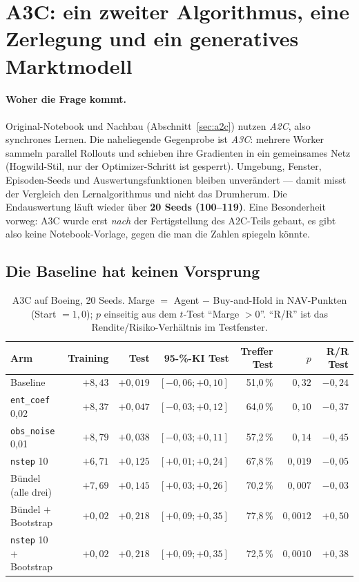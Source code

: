 \section{A3C: ein zweiter Algorithmus, eine Zerlegung und ein generatives Marktmodell}
\label{sec:a3c}

\paragraph{Woher die Frage kommt.} Original-Notebook und Nachbau (Abschnitt~\ref{sec:a2c})
nutzen \emph{A2C}, also synchrones Lernen. Die naheliegende Gegenprobe ist \emph{A3C}:
mehrere Worker sammeln parallel Rollouts und schieben ihre Gradienten in ein gemeinsames
Netz (Hogwild-Stil, nur der Optimizer-Schritt ist gesperrt). Umgebung, Fenster,
Episoden-Seeds und Auswertungsfunktionen bleiben unverändert --- damit misst der Vergleich
den Lernalgorithmus und nicht das Drumherum. Die Endauswertung läuft wieder über
\textbf{20 Seeds (100--119)}. Eine Besonderheit vorweg: A3C wurde erst
\emph{nach} der Fertigstellung des A2C-Teils gebaut, es gibt also keine
Notebook-Vorlage, gegen die man die Zahlen spiegeln könnte.

\subsection{Die Baseline hat keinen Vorsprung}

\begin{table}[H]
  \centering
  \caption{A3C auf Boeing, 20 Seeds. Marge $=$ Agent $-$ Buy-and-Hold in NAV-Punkten
           (Start $=1{,}0$); $p$ einseitig aus dem $t$-Test ``Marge $>0$''.
           ``R/R'' ist das Rendite/Risiko-Verhältnis im Testfenster.}
  \label{tab:a3c-arms}
  \small
  \begin{tabular}{lrrrrrr}
    \toprule
    Arm & Training & Test & 95-\%-KI Test & Treffer Test & $p$ & R/R Test\\
    \midrule
    Baseline                 & $+8{,}43$ & $+0{,}019$ & $[-0{,}06;+0{,}10]$ & 51,0\,\% & $0{,}32$  & $-0{,}24$\\
    \texttt{ent\_coef} 0,02  & $+8{,}37$ & $+0{,}047$ & $[-0{,}03;+0{,}12]$ & 64,0\,\% & $0{,}10$  & $-0{,}37$\\
    \texttt{obs\_noise} 0,01 & $+8{,}79$ & $+0{,}038$ & $[-0{,}03;+0{,}11]$ & 57,2\,\% & $0{,}14$  & $-0{,}45$\\
    \texttt{nstep} 10        & $+6{,}71$ & $+0{,}125$ & $[+0{,}01;+0{,}24]$ & 67,8\,\% & $0{,}019$ & $-0{,}05$\\
    Bündel (alle drei)       & $+7{,}69$ & $+0{,}145$ & $[+0{,}03;+0{,}26]$ & 70,2\,\% & $0{,}007$ & $-0{,}03$\\
    Bündel $+$ Bootstrap     & $+0{,}02$ & $+0{,}218$ & $[+0{,}09;+0{,}35]$ & 77,8\,\% & $0{,}0012$& $+0{,}50$\\
    \texttt{nstep} 10 $+$ Bootstrap & $+0{,}02$ & $+0{,}218$ & $[+0{,}09;+0{,}35]$ & 72,5\,\% & $0{,}0010$& $+0{,}38$\\
    \bottomrule
  \end{tabular}
\end{table}

